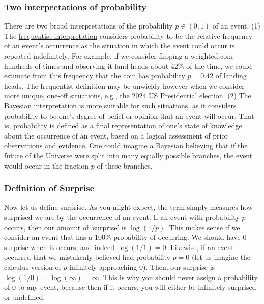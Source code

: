 \documentclass{article}
\begin{document}
\subsubsection*{Two interpretations of probability}
There are two broad interpretations of the probability $p \in (0, 1)$ of an event. (1) The \href{https://en.wikipedia.org/wiki/Frequentist_probability}{frequentist interpretation} considers probability to be the relative frequency of an event's occurrence as the situation in which the event could occur is repeated indefinitely. For example, if we consider flipping a weighted coin hundreds of times and observing it land heads about 42\% of the time, we could estimate from this frequency that the coin has probability $p=0.42$ of landing heads. The frequentist definition may be unwieldy however when we consider more unique, one-off situations, e.g., the 2024 US Presidential election. (2) The \href{https://en.wikipedia.org/wiki/Bayesian_probability}{Bayesian interpretation} is more suitable for such situations, as it considers probability to be one's degree of belief or opinion that an event will occur. That is, probability is defined as a final representation of one's state of knowledge about the occurrence of an event, based on a logical assessment of prior observations and evidence. One could imagine a Bayesian believing that if the future of the Universe were split into many equally possible branches, the event would occur in the fraction $p$ of these branches. 


\subsubsection*{Definition of Surprise}
Now let us define surprise. As you might expect, the term simply measures how surprised we are by the occurrence of an event. If an event with probability $p$ occurs, then our amount of `surprise' is $\log(1/p)$. This makes sense if we consider an event that has a 100\% probability of occurring. We should have 0 surprise when it occurs, and indeed $\log(1/1) = 0$. Likewise, if an event occurred that we mistakenly believed had probability $p = 0$ (let us imagine the calculus version of $p$ infinitely approaching 0). Then, our surprise is $\log(1/0) = \log(\infty) = \infty$. This is why you should never assign a probability of 0 to any event, because then if it occurs, you will either be infinitely surprised or undefined. 


\newcommand{\ptype}[1]{$p_{\mathrm{#1}}(\textbf{x})$}
\end{document}
